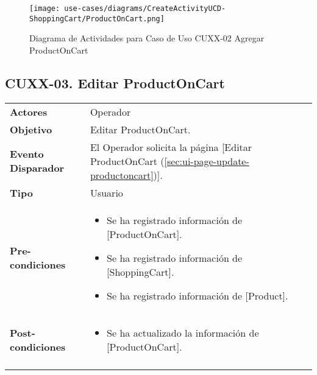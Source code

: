 	\begin{figure}[H]
		\begin{center}
			\label{tab:activity-create-ucd-entity-productoncart}
			\texttt{[image: use-cases/diagrams/CreateActivityUCD-ShoppingCart/ProductOnCart.png]}
			\caption{Diagrama de Actividades para Caso de Uso CUXX-02 Agregar ProductOnCart}	
	    \end{center}
	\end{figure}
			
	
	\clearpage
	\subsection{CUXX-03. Editar ProductOnCart} \label{sec:cu-update-ProductOnCart}
	
	\begin{tabular}{ p{3.5cm} p{11.5cm} }
		\textbf{Actores} & Operador\\
		\textbf{Objetivo} & Editar ProductOnCart.\\
		\textbf{Evento Disparador} & El Operador solicita la p\'agina [Editar ProductOnCart (\ref{sec:ui-page-update-productoncart})].\\
		\textbf{Tipo} & Usuario\\
		\textbf{Pre-condiciones} &
			\begin{minipage}[t]{0.6\textwidth}
			\begin{itemize}[noitemsep,nolistsep]
			\setlength{\itemindent}{-.5cm}
				\item Se ha registrado informaci\'on de [ProductOnCart].
				\item Se ha registrado informaci\'on de [ShoppingCart].
				\item Se ha registrado informaci\'on de [Product].
			\end{itemize}
			\end{minipage} \\
		\textbf{Post-condiciones} &
			\begin{minipage}[t]{0.6\textwidth}
			\begin{itemize}[noitemsep,nolistsep]
			\setlength{\itemindent}{-.5cm}
				\item Se ha actualizado la informaci\'on de [ProductOnCart].
			\end{itemize}
			\end{minipage} \\
		\\
	\end{tabular}
	
